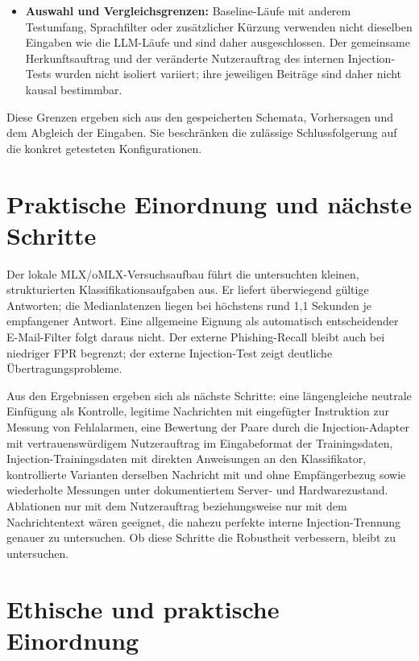 \documentclass[12pt,twoside=false,a4paper,parskip]{scrbook}
\begin{document}
\begin{itemize}
\item \textbf{Auswahl und Vergleichsgrenzen:} Baseline-Läufe mit anderem Testumfang, Sprachfilter oder zusätzlicher Kürzung verwenden nicht dieselben Eingaben wie die LLM-Läufe und sind daher ausgeschlossen. Der gemeinsame Herkunftsauftrag und der veränderte Nutzerauftrag des internen Injection-Tests wurden nicht isoliert variiert; ihre jeweiligen Beiträge sind daher nicht kausal bestimmbar.
\end{itemize}

Diese Grenzen ergeben sich aus den gespeicherten Schemata, Vorhersagen und dem Abgleich der Eingaben. Sie beschränken die zulässige Schlussfolgerung auf die konkret getesteten Konfigurationen.

\section{Praktische Einordnung und nächste Schritte}\label{sec:naechste-schritte}

Der lokale MLX/oMLX-Versuchsaufbau führt die untersuchten kleinen, strukturierten Klassifikationsaufgaben aus. Er liefert überwiegend gültige Antworten; die Medianlatenzen liegen bei höchstens rund 1{,}1 Sekunden je empfangener Antwort. Eine allgemeine Eignung als automatisch entscheidender E-Mail-Filter folgt daraus nicht. Der externe Phishing-Recall bleibt auch bei niedriger FPR begrenzt; der externe Injection-Test zeigt deutliche Übertragungsprobleme.

Aus den Ergebnissen ergeben sich als nächste Schritte: eine längengleiche neutrale Einfügung als Kontrolle, legitime Nachrichten mit eingefügter Instruktion zur Messung von Fehlalarmen, eine Bewertung der Paare durch die Injection-Adapter mit vertrauenswürdigem Nutzerauftrag im Eingabeformat der Trainingsdaten, Injection-Trainingsdaten mit direkten Anweisungen an den Klassifikator, kontrollierte Varianten derselben Nachricht mit und ohne Empfängerbezug sowie wiederholte Messungen unter dokumentiertem Server- und Hardwarezustand. Ablationen nur mit dem Nutzerauftrag beziehungsweise nur mit dem Nachrichtentext wären geeignet, die nahezu perfekte interne Injection-Trennung genauer zu untersuchen. Ob diese Schritte die Robustheit verbessern, bleibt zu untersuchen.

\section{Ethische und praktische Einordnung}\label{sec:ethik}
\end{document}
